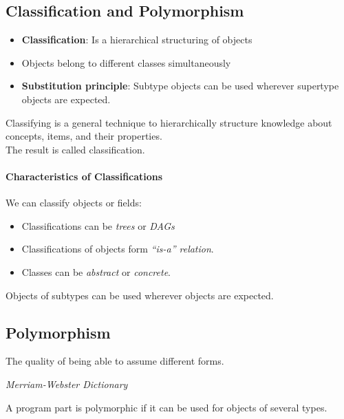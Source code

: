 \subsection{Classification and Polymorphism}
\begin{itemize}
 \item \textbf{Classification}: Is a hierarchical structuring of objects
 \item Objects belong to different classes simultaneously
 \item \textbf{Substitution principle}: Subtype objects can be used wherever supertype objects are expected.
\end{itemize}

\begin{definition}[Classification]
Classifying is a general technique to hierarchically
structure knowledge about concepts, items, and
their properties.\\
The result is called classification.
\end{definition}

\paragraph{Characteristics of Classifications} We can classify objects or fields:
\begin{itemize}
 \item Classifications can be \emph{trees} or \emph{DAGs}
 \item Classifications of objects form \emph{``is-a'' relation}.
 \item Classes can be \emph{abstract} or \emph{concrete}.
\end{itemize}
\begin{definition}
Objects of subtypes can be used wherever objects are expected.
\end{definition}

\subsection{Polymorphism}
\begin{shadequote}
The quality of being able to assume different forms.\par\emph{Merriam-Webster Dictionary}
\end{shadequote}

\begin{definition}A program part is polymorphic if it can be used for objects of several types.
\end{definition}

